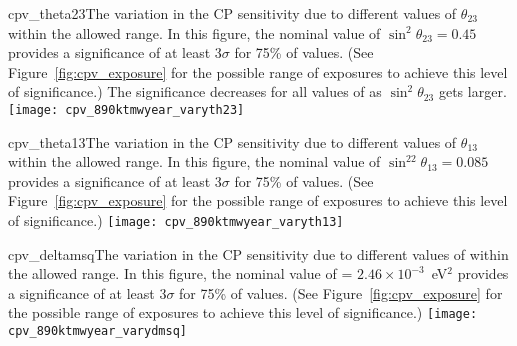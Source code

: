 \begin{cdrfigure}{cpv_theta23}{The variation in the CP sensitivity due to different values of $\theta_{23}$ within the allowed range.  In this figure, the nominal value of $\sin^2\theta_{23} = 0.45$ provides a significance of at least 3$\sigma$ for 75\% of \deltacp values. (See Figure~\ref{fig:cpv_exposure} for the possible range of exposures to achieve this level of significance.) The significance decreases for all values of \deltacp as $\sin^2\theta_{23}$ gets larger.}
 \texttt{[image: cpv\_890ktmwyear\_varyth23]}
\end{cdrfigure}

\begin{cdrfigure}{cpv_theta13}{The variation in the CP sensitivity due to different values of $\theta_{13}$ within the allowed range.  In this figure, the nominal value of $\sin^22\theta_{13} = 0.085$ provides a significance of at least 3$\sigma$ for 75\% of \deltacp values. (See Figure~\ref{fig:cpv_exposure} for the possible range of exposures to achieve this level of significance.)}
 \texttt{[image: cpv\_890ktmwyear\_varyth13]}
\end{cdrfigure}

\begin{cdrfigure}{cpv_deltamsq}{The variation in the CP sensitivity due to different values of  within the allowed range.  In this figure, the nominal value of  = $2.46\times 10^{-3}$~eV$^2$ provides a significance of at least 3$\sigma$ for 75\% of \deltacp values.  (See Figure~\ref{fig:cpv_exposure} for the possible range of exposures to achieve this level of significance.)}
 \texttt{[image: cpv\_890ktmwyear\_varydmsq]}
\end{cdrfigure}



